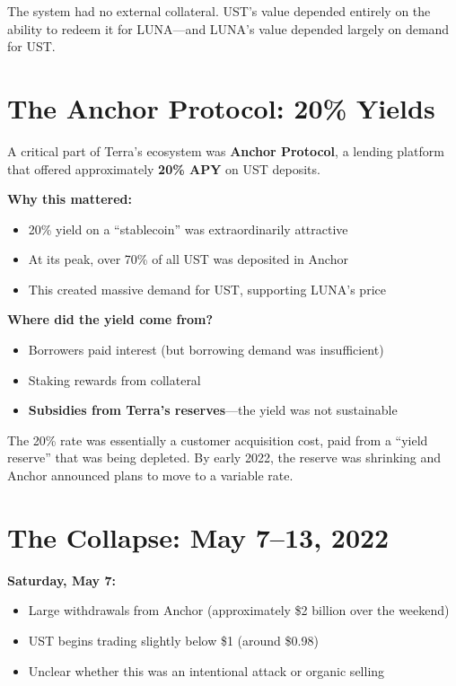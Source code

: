 \documentclass[11pt]{article}
\begin{document}
The system had no external collateral. UST's value depended entirely on the ability to redeem it for LUNA---and LUNA's value depended largely on demand for UST.

\section*{The Anchor Protocol: 20\% Yields}

A critical part of Terra's ecosystem was \textbf{Anchor Protocol}, a lending platform that offered approximately \textbf{20\% APY} on UST deposits.

\medskip
\noindent\textbf{Why this mattered:}
\begin{itemize}[leftmargin=*]
\item 20\% yield on a ``stablecoin'' was extraordinarily attractive
\item At its peak, over 70\% of all UST was deposited in Anchor
\item This created massive demand for UST, supporting LUNA's price
\end{itemize}

\medskip
\noindent\textbf{Where did the yield come from?}
\begin{itemize}[leftmargin=*]
\item Borrowers paid interest (but borrowing demand was insufficient)
\item Staking rewards from collateral
\item \textbf{Subsidies from Terra's reserves}---the yield was not sustainable
\end{itemize}

The 20\% rate was essentially a customer acquisition cost, paid from a ``yield reserve'' that was being depleted. By early 2022, the reserve was shrinking and Anchor announced plans to move to a variable rate.

\section*{The Collapse: May 7--13, 2022}


\noindent\textbf{Saturday, May 7:}
\begin{itemize}[leftmargin=*]
\item Large withdrawals from Anchor (approximately \$2 billion over the weekend)
\item UST begins trading slightly below \$1 (around \$0.98)
\item Unclear whether this was an intentional attack or organic selling
\end{itemize}
\end{document}
